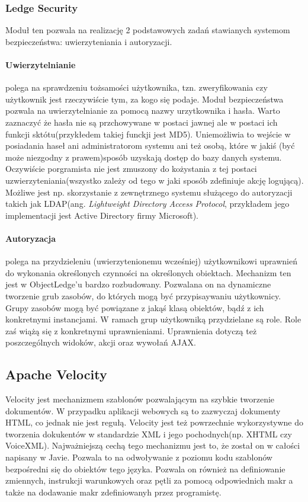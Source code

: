 \subsubsection{Ledge Security}
Moduł ten pozwala na realizację 2 podstawowych zadań stawianych systemom bezpieczeństwa: uwierzyteniania i autoryzacji.

\paragraph{Uwierzytelnianie} polega na sprawdzeniu tożsamości użytkownika, tzn. zweryfikowania czy użytkownik jest rzeczywiście tym, za kogo się podaje. Moduł bezpieczeństwa pozwala na uwierzytelnianie za pomocą nazwy urzytkownika i hasła. Warto zaznaczyć że hasła nie są przchowywane w postaci jawnej ale w postaci ich funkcji sktótu(przykłedem takiej funckji jest MD5). Uniemożliwia to wejście w posiadania haseł ani administratorom systemu ani też osobą, które w jakiś (być może niezgodny z prawem)sposób uzyskają dostęp do bazy danych systemu. Oczywiście porgramista nie jest zmuszony do kożystania z tej postaci uzwierzyteniania(wszystko zależy od tego w jaki sposób zdefiniuje akcję logującą). Możliwe jest np. skorzystanie z zewnętrznego systemu służącego do autoryzacji takich jak LDAP(ang. \textit{Lightweight Directory Access Protocol}, przykładem jego implementacji jest Active Directory firmy Microsoft).

\paragraph{Autoryzacja} polega na przydzieleniu (uwierzytenionemu wcześniej) użytkownikowi uprawnień do wykonania określonych czynności na określonych obiektach. Mechanizm ten jest w ObjectLedge'u bardzo rozbudowany. Pozwalana on na dynamiczne tworzenie grub zasobów, do których mogą być przypisaywaniu użytkownicy. Grupy zasobów mogą być powiązane z jakąś klasą obiektów, bądź z ich konkretnymi instancjami. W ramach grup użytkowniką przydzielane są role. Role zaś wiążą się z konkretnymi uprawnieniami. Uprawnienia dotyczą też poszczególnych widoków, akcji oraz wywołań AJAX.

\subsection[Apache Velocity][Apache Velocity]{Apache Velocity}
Velocity jest mechanizmem szablonów pozwalającym na szybkie tworzenie dokumentów. W przypadku aplikacji webowych są to zazwyczaj dokumenty HTML, co jednak nie jest regułą. Velocity jest też powrzechnie wykorzystywne do tworzenia dokukentów w standardzie XML i jego pochodnych(np. XHTML czy VoiceXML). Najważniejszą cechą tego mechanizmu jest to, że został on w całości napisany w Javie. Pozwala to na odwoływanie z poziomu kodu szablonów bezpośredni się do obiektów tego języka. Pozwala on również na definiowanie zmiennych, instrukcji warunkowych oraz pętli za pomocą odpowiednich makr a także na dodawanie makr zdefiniowanyh przez programistę.

